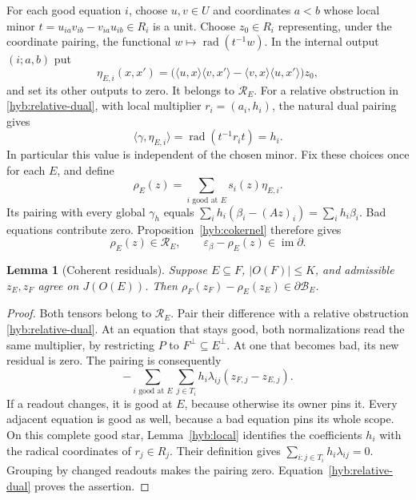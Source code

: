 \documentclass[11pt]{article}
\DeclareMathOperator{\im}{im}
\newtheorem{lemma}[theorem]{Lemma}
\theoremstyle{definition}
\theoremstyle{remark}
\numberwithin{equation}{section}
\begin{document}
For each good equation $i$, choose $u,v\in U$ and coordinates $a<b$
whose local minor $t=u_{ia}v_{ib}-v_{ia}u_{ib}\in R_i$ is a unit.
Choose $z_0\in R_i$ representing, under the coordinate pairing, the
functional $w\mapsto\operatorname{rad}(t^{-1}w)$.  In the internal
output $(i;a,b)$ put
\[
 \eta_{E,i}(x,x')=
   \bigl(\langle u,x\rangle\langle v,x'\rangle
          -\langle v,x\rangle\langle u,x'\rangle\bigr)z_0,
\]
and set its other outputs to zero.  It belongs to $\mathcal R_E$.
For a relative obstruction in \eqref{hyb:relative-dual}, with local
multiplier $r_i=(a_i,h_i)$, the natural dual pairing gives
\begin{equation}
 \langle\gamma,\eta_{E,i}\rangle
     =\operatorname{rad}(t^{-1}r_it)=h_i.
 \label{hyb:normalized-residual}
\end{equation}
In particular this value is independent of the chosen minor.
Fix these choices once for each $E$, and define
\begin{equation}
 \rho_E(z)=\sum_{i\text{ good at }E}s_i(z)\eta_{E,i}.
 \label{hyb:rho}
\end{equation}
Its pairing with every global $\gamma_h$ equals
$\sum_i h_i(\beta_i-(Az)_i)=\sum_i h_i\beta_i$.
Bad equations contribute zero.  Proposition~\ref{hyb:cokernel} therefore gives
\begin{equation}
 \rho_E(z)\in\mathcal R_E,\qquad
 \varepsilon_\beta-\rho_E(z)\in\im\partial.
 \label{hyb:global-residual}
\end{equation}

\begin{lemma}[Coherent residuals]
\label{hyb:coherence}
Suppose $E\subseteq F$, $|O(F)|\le K$, and admissible $z_E,z_F$ agree
on $J(O(E))$.  Then
$\rho_F(z_F)-\rho_E(z_E)\in\partial\mathcal B_E$.
\end{lemma}

\begin{proof}
Both tensors belong to $\mathcal R_E$.  Pair their difference with a
relative obstruction \eqref{hyb:relative-dual}.  At an equation that
stays good, both normalizations read the same multiplier, by restricting
$P$ to $F^\perp\subseteq E^\perp$.  At one that becomes bad, its new
residual is zero.  The pairing is consequently
\[
 -\sum_{i\text{ good at }E}\sum_{j\in T_i}
       h_i\lambda_{ij}(z_{F,j}-z_{E,j}).
\]
If a readout changes, it is good at $E$, because otherwise its owner
pins it.  Every adjacent equation is good as well, because a bad
equation pins its whole scope.  On this complete good star,
Lemma~\ref{hyb:local} identifies the coefficients $h_i$ with the radical
coordinates of $r_j\in R_j$. Their definition gives
$\sum_{i:j\in T_i}h_i\lambda_{ij}=0$.
Grouping by changed readouts makes the pairing zero.
Equation~\eqref{hyb:relative-dual} proves the assertion.
\end{proof}
\end{document}

